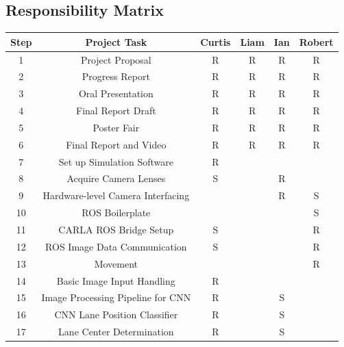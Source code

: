 \documentclass[titlepage]{article}
\begin{document}
\subsection{Responsibility Matrix}
\begin{table}[H]
	\centering
	\begin{tabular}{|c | c | c | c | c | c |}
		\hline
		Step & Project Task                      & Curtis & Liam & Ian & Robert \\ [0.5ex]
		\hline
		1    & Project Proposal                  & R      & R    & R   & R      \\
		\hline
		2    & Progress Report                   & R      & R    & R   & R      \\
		\hline
		3    & Oral Presentation                 & R      & R    & R   & R      \\
		\hline
		4    & Final Report Draft                & R      & R    & R   & R      \\
		\hline
		5    & Poster Fair                       & R      & R    & R   & R      \\
		\hline
		6    & Final Report and Video            & R      & R    & R   & R      \\
		\hline
		7    & Set up Simulation Software        & R      &      &     &        \\
		\hline
		8    & Acquire Camera Lenses             & S      &      & R   &        \\
		\hline
		9    & Hardware-level Camera Interfacing &        &      & R   & S      \\
		\hline
		10   & ROS Boilerplate                   &        &      &     & S      \\
		\hline
		11   & CARLA ROS Bridge Setup            & S      &      &     & R      \\
		\hline
		12   & ROS Image Data Communication      & S      &      &     & R      \\
		\hline
		13   & Movement                          &        &      &     & R      \\
		\hline
		14   & Basic Image Input Handling        & R      &      &     &        \\
		\hline
		15   & Image Processing Pipeline for CNN & R      &      & S   &        \\
		\hline
		16   & CNN Lane Position Classifier      & R      &      & S   &        \\
		\hline
		17   & Lane Center Determination         & R      &      & S   &        \\

\end{tabular}
\end{table}
\end{document}
